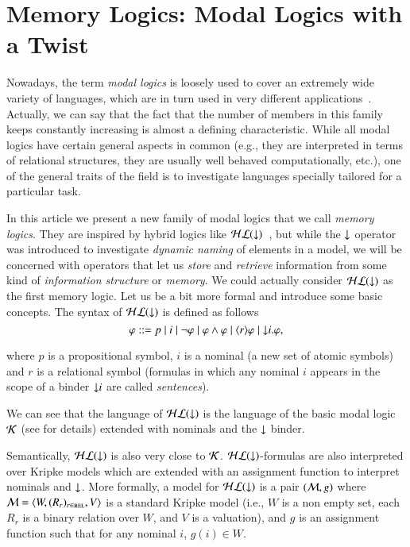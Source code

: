 \section{Memory Logics: Modal Logics with a Twist}\label{twist}

Nowadays, the term \emph{modal logics} is loosely used to cover
an extremely wide variety of languages, which are in turn used
in very different applications~\cite{BRV01,blac:hand06}.  Actually,
we can say that the fact
that the number of members in this family keeps constantly increasing
is almost a defining characteristic.  While all modal logics have
certain general aspects in common (e.g., they are interpreted in
terms of relational structures, they are usually well behaved
computationally, etc.), one of the general traits of the field is
to investigate languages specially tailored for a particular task.

In this article we present a new family of modal logics that
we call \emph{memory logics}. They
are inspired by hybrid logics like $\mathcal{HL}({\downarrow})$~\cite{arec:hybr05b}, but while the
${\downarrow}$ operator was introduced to investigate \emph{dynamic naming}
of elements in a model, we will be concerned with operators that
let us \emph{store} and \emph{retrieve} information from some kind
of \emph{information structure} or \emph{memory}.
We could actually consider $\mathcal{HL}({\downarrow})$ as the first memory logic.
Let us be a bit more formal and introduce some basic concepts.
The syntax of $\mathcal{HL}({\downarrow})$ is defined as follows
$$
\varphi ::= p \mid i \mid \lnot \varphi \mid \varphi \land
\varphi \mid \langle r \rangle \varphi \mid {\downarrow} i. \varphi,
$$

\noindent
where $p$ is a propositional symbol, $i$ is a nominal (a new set of
atomic symbols) and  $r$ is a relational symbol (formulas in which any nominal $i$
appears in the scope of a binder ${\downarrow} i$ are called \emph{sentences}).

We can see that the language of $\mathcal{HL}({\downarrow})$ is the language of the basic
modal logic $\mathcal{K}$ (see \cite{BRV01} for details) extended with nominals
and the ${\downarrow}$ binder.

Semantically, $\mathcal{HL}({\downarrow})$ is also very close to $\mathcal{K}$.  $\mathcal{HL}({\downarrow})$-formulas are also interpreted over Kripke models which are extended with an
assignment function to interpret nominals and ${\downarrow}$. More formally,
a model for $\mathcal{HL}({\downarrow})$ is a pair $(\mathcal{M},g)$ where $\mathcal{M}=\langle W,(R_r)_{r \in \textsc{rel}},V \rangle$ is a standard Kripke model (i.e., $W$ is a non empty set, each $R_r$ is a binary relation
over $W$, and $V$ is a valuation), and $g$ is an assignment function
such that for any nominal $i$, $g(i) \in W$.

